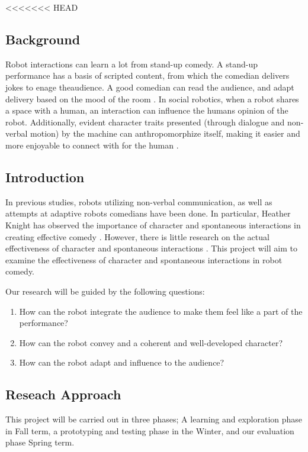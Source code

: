 \documentclass[onecolumn, draftclsnofoot,10pt, compsoc]{IEEEtran}
\begin{document}
<<<<<<< HEAD


\subsection{Background}
Robot interactions can learn a lot from stand-up comedy. A stand-up performance has a basis of scripted content, from which the comedian delivers jokes to enage theaudience. A good comedian can read the audience, and adapt delivery based on the mood of the room \cite{talkingFunny}. In social robotics, when a robot shares a space with a human, an interaction can influence the humans opinion of the robot. Additionally, evident character traits presented (through dialogue and non-verbal motion) by the machine can anthropomorphize itself, making it easier and more enjoyable to connect with for the human \cite{KnightEightLessons:2011}.



\subsection{Introduction}
In previous studies, robots utilizing non-verbal communication, as well as attempts at adaptive robots comedians have been done. In particular, Heather Knight has observed the importance of character and spontaneous interactions in creating effective comedy \cite{KnightEightLessons:2011}. However, there is little research on the actual effectiveness of character and spontaneous interactions \cite{KatevasRobot:2014}. This project will aim to examine the effectiveness of character and spontaneous interactions in robot comedy.

Our research will be guided by the following questions:
\begin{enumerate}[\IEEEsetlabelwidth{6)}]
\item How can the robot integrate the audience to make them feel like a part of the performance?
\item How can the robot convey and a coherent and well-developed character?
\item How can the robot adapt and influence to the audience?
\end{enumerate}


\subsection{Reseach Approach}
This project will be carried out in three phases; A learning and exploration phase in Fall term, a prototyping and testing phase in the Winter, and our evaluation phase Spring term.
\end{document}
